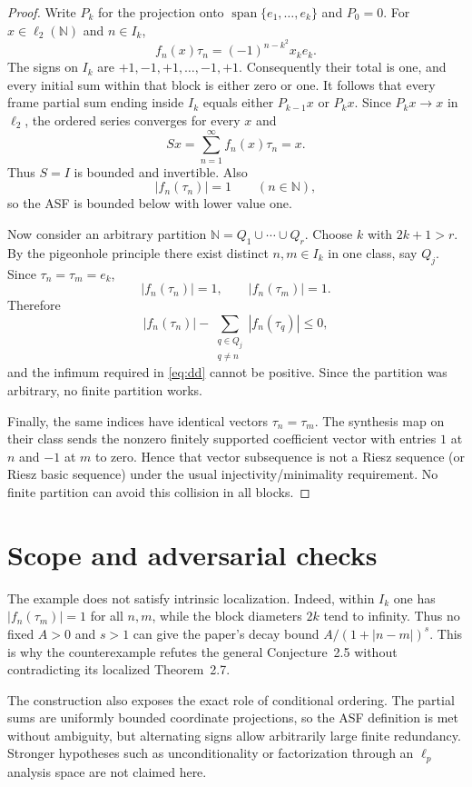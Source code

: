 \documentclass[11pt]{article}
\newcommand{\N}{\mathbb N}
\newcommand{\ellTwo}{\ell_2(\N)}
\begin{document}
\begin{proof}
Write $P_k$ for the projection onto
$\operatorname{span}\{e_1,\ldots,e_k\}$ and $P_0=0$. For $x\in\ellTwo$ and
$n\in I_k$,
\[
 f_n(x)\tau_n=(-1)^{n-k^2}x_ke_k.
\]
The signs on $I_k$ are $+1,-1,+1,\ldots,-1,+1$. Consequently their total is
one, and every initial sum within that block is either zero or one. It follows
that every frame partial sum ending inside $I_k$ equals either $P_{k-1}x$ or
$P_kx$. Since $P_kx\to x$ in $\ell_2$, the ordered series converges for every
$x$ and
\[
 Sx=\sum_{n=1}^{\infty}f_n(x)\tau_n=x.
\]
Thus $S=I$ is bounded and invertible. Also
\[
 |f_n(\tau_n)|=1\qquad(n\in\N),
\]
so the ASF is bounded below with lower value one.

Now consider an arbitrary partition $\N=Q_1\cup\cdots\cup Q_r$. Choose $k$
with $2k+1>r$. By the pigeonhole principle there exist distinct
$n,m\in I_k$ in one class, say $Q_j$. Since $\tau_n=\tau_m=e_k$,
\[
 |f_n(\tau_n)|=1,
 \qquad |f_n(\tau_m)|=1.
\]
Therefore
\[
 |f_n(\tau_n)|-
 \sum_{\substack{q\in Q_j\\q\ne n}}|f_n(\tau_q)|\le0,
\]
and the infimum required in \eqref{eq:dd} cannot be positive. Since the
partition was arbitrary, no finite partition works.

Finally, the same indices have identical vectors $\tau_n=\tau_m$. The
synthesis map on their class sends the nonzero finitely supported coefficient
vector with entries $1$ at $n$ and $-1$ at $m$ to zero. Hence that vector
subsequence is not a Riesz sequence (or Riesz basic sequence) under the usual
injectivity/minimality requirement. No finite partition can avoid this
collision in all blocks.
\end{proof}

\section{Scope and adversarial checks}

The example does not satisfy intrinsic localization. Indeed, within $I_k$ one
has $|f_n(\tau_m)|=1$ for all $n,m$, while the block diameters $2k$ tend to
infinity. Thus no fixed $A>0$ and $s>1$ can give the paper's decay bound
$A/(1+|n-m|)^s$. This is why the counterexample refutes the general
Conjecture~2.5 without contradicting its localized Theorem~2.7.

The construction also exposes the exact role of conditional ordering. The
partial sums are uniformly bounded coordinate projections, so the ASF
definition is met without ambiguity, but alternating signs allow arbitrarily
large finite redundancy. Stronger hypotheses such as unconditionality or
factorization through an $\ell_p$ analysis space are not claimed here.
\end{document}
